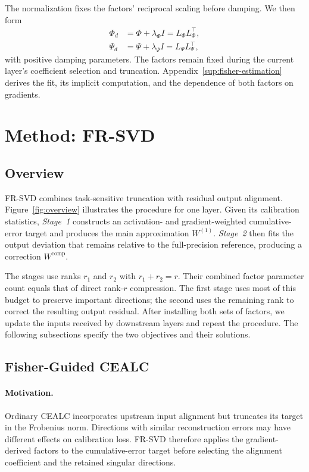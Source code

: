 \documentclass[11pt]{article}
\begin{document}
The normalization fixes the factors' reciprocal scaling before damping. We then form
\begin{equation}
\begin{aligned}
\Phi_d&=\Phi+\lambda_\Phi I=L_\Phi L_\Phi^\top,\\
\Psi_d&=\Psi+\lambda_\Psi I=L_\Psi L_\Psi^\top,
\end{aligned}
\label{eq:fisher-cholesky}
\end{equation}
with positive damping parameters. The factors remain fixed during the current layer's coefficient selection and truncation. Appendix~\ref{sup:fisher-estimation} derives the fit, its implicit computation, and the dependence of both factors on gradients.

\section{Method: FR-SVD}\label{sec:method}

\subsection{Overview}\label{sec:overview}

FR-SVD combines task-sensitive truncation with residual output alignment. Figure~\ref{fig:overview} illustrates the procedure for one layer. Given its calibration statistics, \emph{Stage~1} constructs an activation- and gradient-weighted cumulative-error target and produces the main approximation $W^{(1)}$. \emph{Stage~2} then fits the output deviation that remains relative to the full-precision reference, producing a correction $W^{\mathrm{comp}}$.



The stages use ranks $r_1$ and $r_2$ with $r_1+r_2=r$. Their combined factor parameter count equals that of direct rank-$r$ compression. The first stage uses most of this budget to preserve important directions; the second uses the remaining rank to correct the resulting output residual. After installing both sets of factors, we update the inputs received by downstream layers and repeat the procedure. The following subsections specify the two objectives and their solutions.

\subsection{Fisher-Guided CEALC}\label{sec:fisher-cealc}

\paragraph{Motivation.}
Ordinary CEALC incorporates upstream input alignment but truncates its target in the Frobenius norm. Directions with similar reconstruction errors may have different effects on calibration loss. FR-SVD therefore applies the gradient-derived factors to the cumulative-error target before selecting the alignment coefficient and the retained singular directions.
\end{document}

